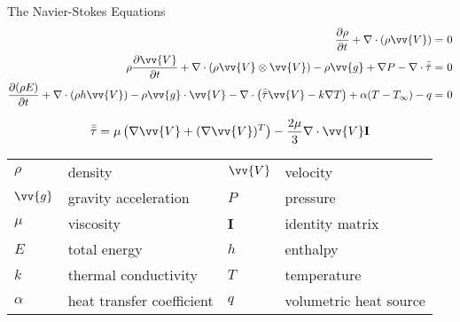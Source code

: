 \documentclass{beamer}
\begin{document}
\begin{frame}{The Navier-Stokes Equations}
\small
\begin{equation}
\begin{aligned}
\frac{\partial\rho}{\partial t} + \nabla\cdot(\rho\vv{V})=&\ 0\\
\rho\frac{\partial\vv{V}}{\partial t}+\nabla\cdot(\rho\vv{V}\otimes\vv{V})-\rho \vv{g}+\nabla P-\nabla\cdot\bar{\bar{\tau}}=&\ 0\\
\frac{\partial (\rho E)}{\partial t}+\nabla\cdot(\rho h\vv{V})-\rho \vv{g}\cdot\vv{V}-\nabla\cdot\left(\bar{\bar{\tau}}\vv{V}-k\nabla T\right)+\alpha(T-T_\infty)-q=&\ 0\\
\end{aligned}
\end{equation}

\begin{equation}
\bar{\bar{\tau}}= \mu\left(\nabla \vv{V}+(\nabla \vv{V})^T\right)-\frac{2\mu}{3}\nabla\cdot\vv{V}\textbf{I}
\end{equation}

\normalsize
\begin{tabular}{l l l l}
\(\rho\) & density & \(\vv{V}\) & velocity\\
\(\vv{g}\) & gravity acceleration & \(P\) & pressure\\
\(\mu\) & viscosity & \(\textbf{I}\) & identity matrix\\
\(E\) & total energy & \(h\) & enthalpy\\
\(k\) & thermal conductivity & \(T\) & temperature\\
\(\alpha\) & heat transfer coefficient & \(q\) & volumetric heat source\\
\end{tabular}

\end{frame}

\end{document}
